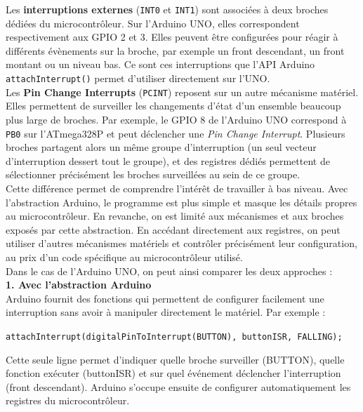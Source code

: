 Les \textbf{interruptions externes} (\texttt{INT0} et \texttt{INT1}) sont associées à deux broches dédiées du microcontrôleur. Sur l'Arduino UNO, elles correspondent respectivement aux GPIO 2 et 3. Elles peuvent être configurées pour réagir à différents évènements sur la broche, par exemple un front descendant, un front montant ou un niveau bas. Ce sont ces interruptions que l'API Arduino \texttt{attachInterrupt()} permet d'utiliser directement sur l'UNO.\\

Les \textbf{Pin Change Interrupts} (\texttt{PCINT}) reposent sur un autre mécanisme matériel. Elles permettent de surveiller les changements d'état d'un ensemble beaucoup plus large de broches. Par exemple, le GPIO 8 de l'Arduino UNO correspond à \texttt{PB0} sur l'ATmega328P et peut déclencher une \textit{Pin Change Interrupt}. Plusieurs broches partagent alors un même groupe d'interruption (un seul vecteur d'interruption dessert tout le groupe), et des registres dédiés permettent de sélectionner précisément les broches surveillées au sein de ce groupe.\\

Cette différence permet de comprendre l'intérêt de travailler à bas niveau. Avec l'abstraction Arduino, le programme est plus simple et masque les détails propres au microcontrôleur. En revanche, on est limité aux mécanismes et aux broches exposés par cette abstraction. En accédant directement aux registres, on peut utiliser d'autres mécanismes matériels et contrôler précisément leur configuration, au prix d'un code spécifique au microcontrôleur utilisé.\\

Dans le cas de l'Arduino UNO, on peut ainsi comparer les deux approches :\\



\textbf{1. Avec l'abstraction Arduino}\\
Arduino fournit des fonctions qui permettent de configurer facilement une interruption sans avoir à manipuler directement le matériel. Par exemple :

\begin{center}
\texttt{attachInterrupt(digitalPinToInterrupt(BUTTON), buttonISR, FALLING);}
\end{center}

Cette seule ligne permet d'indiquer quelle broche surveiller (BUTTON), quelle fonction exécuter (buttonISR) et sur quel événement déclencher l'interruption (front descendant). Arduino s'occupe ensuite de configurer automatiquement les registres du microcontrôleur.\\

